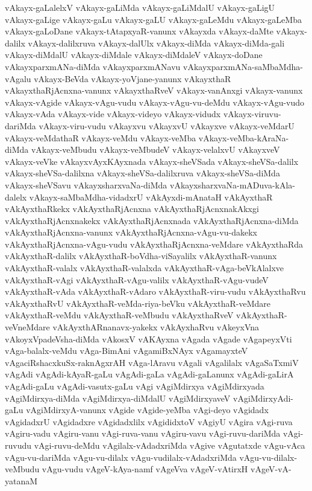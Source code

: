 {vAkayx-gaLalelxV
vAkayx-gaLiMda
vAkayx-gaLiMdalU
vAkayx-gaLigU
vAkayx-gaLige
vAkayx-gaLu
vAkayx-gaLU
vAkayx-gaLeMdu
vAkayx-gaLeMba
vAkayx-gaLoDane
vAkayx-tAtapxyaR-vanunx
vAkayxda
vAkayx-daMte
vAkayx-dalilx
vAkayx-dalilxruva
vAkayx-dalUlx
vAkayx-diMda
vAkayx-diMda-gali
vAkayx-diMdalU
vAkayx-diMdale
vAkayx-diMdaleV
vAkayx-doDane
vAkayxparxmANa-diMda
vAkayxparxmANavu
vAkayxparxmANa-saMbaMdha-vAgalu
vAkayx-BeVda
vAkayx-yoVjane-yanunx
vAkayxthaR
vAkayxthaRjAcnxna-vanunx
vAkayxthaRveV
vAkayx-vanAnxgi
vAkayx-vanunx
vAkayx-vAgide
vAkayx-vAgu-vudu
vAkayx-vAgu-vu-deMdu
vAkayx-vAgu-vudo
vAkayx-vAda
vAkayx-vide
vAkayx-videyo
vAkayx-vidudx
vAkayx-viruvu-dariMda
vAkayx-viru-vudu
vAkayxvu
vAkayxvU
vAkayxve
vAkayx-veMdarU
vAkayx-veMdathaR
vAkayx-veMdu
vAkayx-veMba
vAkayx-veMba-kAraNa-diMda
vAkayx-veMbudu
vAkayx-veMbudeV
vAkayx-velalxvU
vAkayxveV
vAkayx-veVke
vAkayxvAyxKAyxnada
vAkayx-sheVSada
vAkayx-sheVSa-dalilx
vAkayx-sheVSa-dalilxna
vAkayx-sheVSa-dalilxruva
vAkayx-sheVSa-diMda
vAkayx-sheVSavu
vAkayxsharxvaNa-diMda
vAkayxsharxvaNa-mADuva-kAla-dalelx
vAkayx-saMbaMdha-vidadxrU
vAkAyxdi-mAnataH
vAkAyxthaR
vAkAyxthaRkekx
vAkAyxthaRjAcnxna
vAkAyxthaRjAcnxnakAkxgi
vAkAyxthaRjAcnxnakekx
vAkAyxthaRjAcnxnada
vAkAyxthaRjAcnxna-diMda
vAkAyxthaRjAcnxna-vanunx
vAkAyxthaRjAcnxna-vAgu-vu-dakekx
vAkAyxthaRjAcnxna-vAgu-vudu
vAkAyxthaRjAcnxna-veMdare
vAkAyxthaRda
vAkAyxthaR-dalilx
vAkAyxthaR-boVdha-viSayalilx
vAkAyxthaR-vanunx
vAkAyxthaR-valalx
vAkAyxthaR-valalxda
vAkAyxthaR-vAga-beVkAlalxve
vAkAyxthaR-vAgi
vAkAyxthaR-vAgu-valilx
vAkAyxthaR-vAgu-vudeV
vAkAyxthaR-vAda
vAkAyxthaR-vAdaro
vAkAyxthaR-viru-vudu
vAkAyxthaRvu
vAkAyxthaRvU
vAkAyxthaR-veMda-riya-beVku
vAkAyxthaR-veMdare
vAkAyxthaR-veMdu
vAkAyxthaR-veMbudu
vAkAyxthaRveV
vAkAyxthaR-veVneMdare
vAkAyxthARnanavx-yakekx
vAkAyxhaRvu
vAkeyxVna
vAkoyxVpadeVsha-diMda
vAkosxV
vAKAyxna
vAgada
vAgade
vAgapeyxVti
vAga-balalx-veMdu
vAga-BimAni
vAgamiBxNAyx
vAgamayxteV
vAgaciRshacxkuSx-raknAgxrAH
vAga-lAravu
vAgali
vAgalilalx
vAgaSaTxmiV
vAgAdi
vAgAdi-kAyaR-gaLu
vAgAdi-gaLa
vAgAdi-gaLanunx
vAgAdi-gaLirA
vAgAdi-gaLu
vAgAdi-vasutx-gaLu
vAgi
vAgiMdirxya
vAgiMdirxyada
vAgiMdirxya-diMda
vAgiMdirxya-diMdalU
vAgiMdirxyaveV
vAgiMdirxyAdi-gaLu
vAgiMdirxyA-vanunx
vAgide
vAgide-yeMba
vAgi-deyo
vAgidadx
vAgidadxrU
vAgidadxre
vAgidadxlilx
vAgididxtoV
vAgiyU
vAgira
vAgi-ruva
vAgiru-vadu
vAgiru-vanu
vAgi-ruva-vanu
vAgiru-vavu
vAgi-ruvu-dariMda
vAgi-ruvudu
vAgi-ruvu-deMdu
vAgilalx-vAdadxriMda
vAgive
vAgutatxde
vAgu-vAca
vAgu-vu-dariMda
vAgu-vu-dilalx
vAgu-vudilalx-vAdadxriMda
vAgu-vu-dilalx-veMbudu
vAgu-vudu
vAgeV-kAya-namf
vAgeVva
vAgeV-vAtirxH
vAgeV-vA-yatanaM
}
